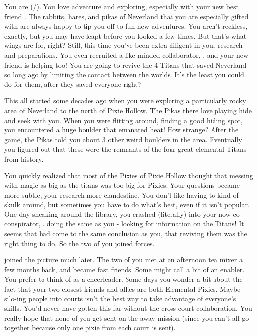 \documentclass[char]{PP}
\begin{document}
\name{\cFTitan{}}

You are \cFTitan{} (\cFTitan{\They}/\cFTitan{\Them}). You love adventure and exploring, especially with your new best friend \cEAirship{}. The rabbits, hares, and pikas of Neverland that you are especially gifted with are always happy to tip you off to fun new adventures. You aren’t reckless, exactly, but you may have leapt before you looked a few times. But that’s what wings are for, right? Still, this time you've been extra diligent in your research and preparations. You even recruited a like-minded collaborator, \cETitan{}, and your new friend \cEAirship{} is helping too! You are going to revive the 4 Titans that saved Neverland so long ago by limiting the contact between the worlds. It’s the least you could do for them, after they saved everyone right? 

This all started some decades ago when you were exploring a particularly rocky area of Neverland to the north of Pixie Hollow. The Pikas there love playing hide and seek with you. When you were flitting around, finding a good hiding spot, you encountered a huge boulder that emanated heat! How strange? After the game, the Pikas told you about 3 other weird boulders in the area. Eventually you figured out that these were the remnants of the four great elemental Titans from history.

You quickly realized that most of the Pixies of Pixie Hollow thought that messing with magic as big as the titans was too big for Pixies. Your questions became more subtle, your research more clandestine. You don’t like having to kind of skulk around, but sometimes you have to do what’s best, even if it isn’t popular. One day sneaking around the library, you crashed (literally) into your now co-conspirator, \cETitan{}. \cETitan{\They} \cETitan{\were} doing the same as you - looking for information on the Titans! It seems that \cETitan{\they} had come to the same conclusion as you, that reviving them was the right thing to do. So the two of you joined forces.

\cEAirship{} joined the picture much later. The two of you met at an afternoon tea mixer a few months back, and became fast friends. Some might call \cEAirship{} a bit of an enabler. You prefer to think of \cEAirship{\them} as a cheerleader. Some days you wonder a bit about the fact that your two closest friends and allies are both Elemental Pixies. Maybe silo-ing people into courts isn’t the best way to take advantage of everyone’s skills. You’d never have gotten this far without the cross court collaboration. You really hope that none of you get sent on the away mission (since you can’t all go together because only one pixie from each court is sent).
\end{document}
